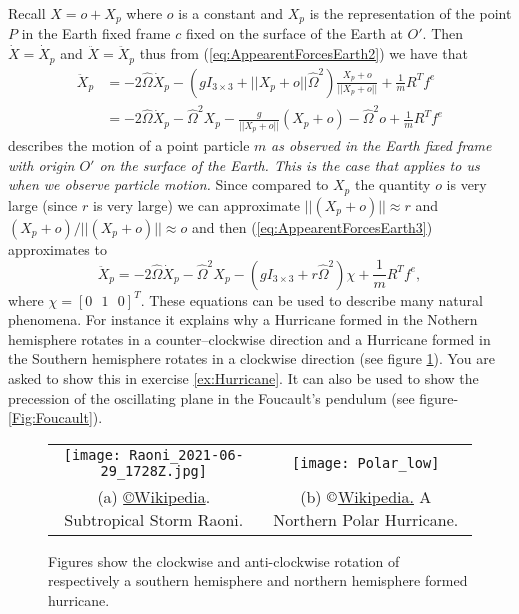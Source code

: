 \documentclass[graybox,envcountchap,sectrefs]{svmonoMuga}
\begin{document}
Recall $X=o+X_p$ where $o$ is a constant and  $X_p$ is the representation of the point $P$ in the Earth fixed frame $c$ fixed on the surface of the Earth at $O'$. Then $\dot{X}=
\dot{X}_p$ and $\ddot{X}=\ddot{X}_p$ thus from (\ref{eq:AppearentForcesEarth2}) we have that
\begin{align}
\ddot{X}_p&=-2\widehat{\Omega}\dot{X}_p-\left(gI_{3\times 3}+||X_p+o||\widehat{\Omega}^2 \right)\frac{X_p+o}{||X_p+o||}+\frac{1}{m}R^Tf^e\nonumber\\
&=-2\widehat{\Omega}\dot{X}_p-\widehat{\Omega}^2{X}_p-\frac{g}{||X_p+o||}(X_p+o)-\widehat{\Omega}^2 o+\frac{1}{m}R^Tf^e\label{eq:AppearentForcesEarth3}
\end{align}
describes the motion of a point particle $m$ \emph{as observed in the Earth fixed frame with origin $O'$ on the surface of the Earth. This is the case that applies to us when we 
observe particle motion.} Since compared to $X_p$ the quantity $o$ is very large (since $r$ is very large) we can approximate $||(X_p+o)||\approx r$  and $(X_p+o)/||(X_p+o)||\approx o$ and then 
(\ref{eq:AppearentForcesEarth3}) approximates to
\begin{equation}
\ddot{X}_p=-2\widehat{\Omega}\dot{X}_p-\widehat{\Omega}^2{X}_p-\left(gI_{3\times 3}+r\widehat{\Omega}^2 \right)\chi+\frac{1}{m}R^Tf^e,\label{eq:AppearentForcesEarth4}
\end{equation}
where $\chi=[0\:\:\:1\:\:\:0]^T$.
These equations can be used to describe many natural phenomena. For instance it explains why a Hurricane formed in the Nothern hemisphere rotates in a counter--clockwise 
direction and a Hurricane formed in the Southern hemisphere rotates in a  clockwise direction (see figure \ref{Fig:Hurricane}).
You are asked to show this in exercise \ref{ex:Hurricane}. It can also be used to show the precession of the oscillating plane in the Foucault's pendulum (see figure-\ref{Fig:Foucault}).

\begin{figure}[ht]
\begin{center}
\begin{tabular}{cc}
\texttt{[image: Raoni\_2021-06-29\_1728Z.jpg]} & \texttt{[image: Polar\_low]}\\
(a) \href{https://en.wikipedia.org/wiki/South_Atlantic_tropical_cyclone#/media/File:Raoni_2021-06-29_1728Z.jpg}{\copyright Wikipedia}. Subtropical Storm Raoni.  & (b)  \href{https://en.wikipedia.org/wiki/Polar_low#/media/File:Polar_low.jpg}{$\copyright$Wikipedia.} A Northern Polar Hurricane.
\end{tabular}
\caption{Figures show the clockwise and anti-clockwise rotation of respectively a southern hemisphere and northern hemisphere formed hurricane. } \label{Fig:Hurricane}
\end{center}
\end{figure}
\end{document}
